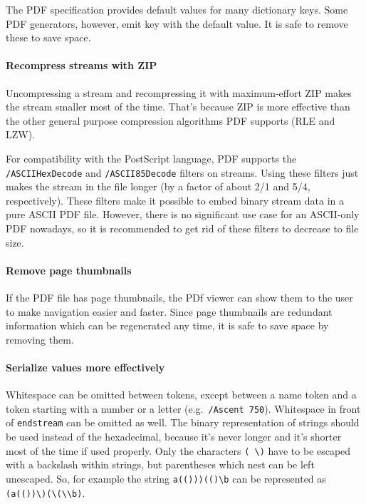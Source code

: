 \documentclass{ltugproc}
\begin{document}
The PDF specification provides default values for many dictionary keys. Some
PDF generators, however, emit key with the default value. It is safe to
remove these to save space.

\paragraph{Recompress streams with ZIP}

Uncompressing a stream and recompressing it with maximum-effort ZIP makes
the stream smaller most of the time. That's because ZIP is more effective
than the other general purpose compression algorithms PDF supports (RLE and
LZW).

For compatibility with the PostScript language, PDF supports the
\texttt{/ASCIIHexDecode} and \texttt{/ASCII85Decode} filters on streams.
Using these filters just makes the stream in the file longer (by a factor of
about 2/1 and 5/4, respectively). These filters make it possible to embed
binary stream data in a pure ASCII PDF file. However, there is no
significant use case for an ASCII-only PDF nowadays, so it is recommended to
get rid of these filters to decrease to file size.

\paragraph{Remove page thumbnails}

If the PDF file has page thumbnails, the PDf viewer can show them to the
user to make navigation easier and faster. Since page thumbnails are redundant
information which can be regenerated any time, it is safe to save space by
removing them.

\paragraph{Serialize values more effectively}

Whitespace can be omitted between tokens, except between a name token and a
token starting with a number or a letter (e.g.\ \texttt{/Ascent 750}).
Whitespace in front of \texttt{endstream} can be omitted as well. The binary
representation of strings should be used instead of the hexadecimal, because
it's never longer and it's shorter most of the time if used properly. Only
the characters \texttt{( \textbackslash\space)} have to be escaped with a
backslash within strings, but parentheses which nest can be left unescaped.
So, for example the string \texttt{a(()))(()\textbackslash b} can be represented
as
\texttt{(a(())\textbackslash)(\textbackslash(\textbackslash\textbackslash b)}.
\end{document}

